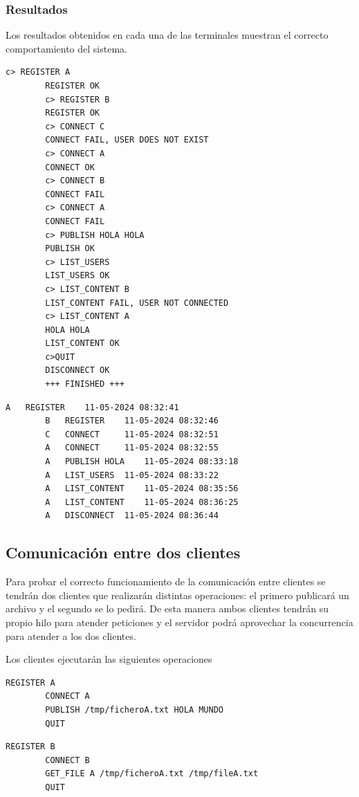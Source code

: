 \documentclass[]{article}
\begin{document}
\subsubsection{Resultados}
\label{subsubsection:resultados_1_cliente}
Los resultados obtenidos en cada una de las terminales muestran el correcto comportamiento del sistema.
\begin{center}
    \begin{lstlisting}[caption=Resultados obtenidos en el cliente]
        c> REGISTER A
        REGISTER OK
        c> REGISTER B
        REGISTER OK
        c> CONNECT C
        CONNECT FAIL, USER DOES NOT EXIST
        c> CONNECT A
        CONNECT OK
        c> CONNECT B
        CONNECT FAIL
        c> CONNECT A
        CONNECT FAIL
        c> PUBLISH HOLA HOLA
        PUBLISH OK 
        c> LIST_USERS
        LIST_USERS OK
        c> LIST_CONTENT B
        LIST_CONTENT FAIL, USER NOT CONNECTED
        c> LIST_CONTENT A
        HOLA HOLA
        LIST_CONTENT OK
        c>QUIT
        DISCONNECT OK
        +++ FINISHED +++
    \end{lstlisting}
\end{center}

\begin{center}
    \begin{lstlisting}[caption=Impresiones del servidor RPC]
        A	REGISTER	11-05-2024 08:32:41
        B	REGISTER	11-05-2024 08:32:46
        C	CONNECT	    11-05-2024 08:32:51
        A	CONNECT	    11-05-2024 08:32:55
        A	PUBLISH HOLA	11-05-2024 08:33:18
        A	LIST_USERS	11-05-2024 08:33:22
        A	LIST_CONTENT	11-05-2024 08:35:56
        A	LIST_CONTENT	11-05-2024 08:36:25
        A	DISCONNECT	11-05-2024 08:36:44
    \end{lstlisting}
\end{center}

\subsection{Comunicación entre dos clientes}
\label{subsection:2_clientes}
Para probar el correcto funcionamiento de la comunicación entre clientes se tendrán dos clientes que realizarán distintas operaciones: el primero publicará un archivo y el segundo se lo pedirá.
De esta manera ambos clientes tendrán su propio hilo para atender peticiones y el servidor podrá aprovechar la concurrencia para atender a los dos clientes.

Los clientes ejecutarán las siguientes operaciones
\begin{center}
    \begin{lstlisting}[caption=Operaciones a realizar por el cliente A]
        REGISTER A
        CONNECT A
        PUBLISH /tmp/ficheroA.txt HOLA MUNDO
        QUIT
    \end{lstlisting}
\end{center}
\begin{center}
    \begin{lstlisting}[caption=Operaciones a realizar por el cliente B]
        REGISTER B
        CONNECT B
        GET_FILE A /tmp/ficheroA.txt /tmp/fileA.txt
        QUIT
    \end{lstlisting}
\end{center}
\end{document}
